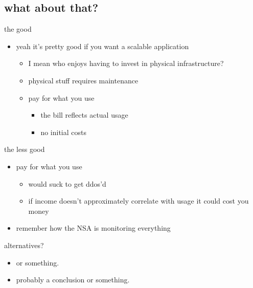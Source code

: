 \documentclass{beamer}
\begin{document}
  \subsection{what about that?}
  \begin{frame}{the good}
    \begin{itemize}
    \item
      yeah it's pretty good if you want a scalable application
      \begin{itemize}
      \item
        I mean who enjoys having to invest in physical infrastructure?
      \item
        physical stuff requires maintenance
      \item
        pay for what you use
        \begin{itemize}
        \item
          the bill reflects actual usage
        \item
          no initial costs
        \end{itemize}
      \end{itemize}
    \end{itemize}
  \end{frame}
  \begin{frame}{the less good}
    \begin{itemize}
    \item
      pay for what you use
      \begin{itemize}
        \item
        would suck to get ddos'd
        \item
        if income doesn't approximately correlate with usage it could cost you money
      \end{itemize}
    \item
    remember how the NSA is monitoring everything
    \end{itemize}
  \end{frame}

  \begin{frame}{alternatives?}

    \begin{itemize}
    \item
      or something.
    \item
      probably a conclusion or something.
    \end{itemize}
  \end{frame}
\end{document}
